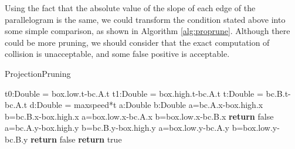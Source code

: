 \documentclass[sigplan]{acmart}
\begin{document}
Using the fact that the absolute value of the slope of each edge of the parallelogram is the same, we could transform the condition stated above into some simple comparison, as shown in Algorithm \ref{alg:proprune}. Although there could be more pruning, we should consider that the exact computation of collision is unacceptable, and some false positive is acceptable.
\begin{algorithm}
\caption{ProjectionPruning} \label{alg:proprune}
\begin{algorithmic}[1]
    \State t0:Double = box.low.t-bc.A.t
    \State t1:Double = box.high.t-bc.A.t
    \State t:Double = bc.B.t-bc.A.t
    \State d:Double = maxspeed*t
    \State a:Double
    \State b:Double
        \State a=bc.A.x-box.high.x
        \State b=bc.B.x-box.high.x
    \Else
        \State a=box.low.x-bc.A.x
        \State b=box.low.x-bc.B.x
    \EndIf
        \State \textbf{return} false
    \EndIf
        \State a=bc.A.y-box.high.y
        \State b=bc.B.y-box.high.y
    \Else
        \State a=box.low.y-bc.A.y
        \State b=box.low.y-bc.B.y
    \EndIf
        \State \textbf{return} false
    \EndIf
    \State \textbf{return} true
\EndFunction
\end{algorithmic}
\end{algorithm}
\end{document}
